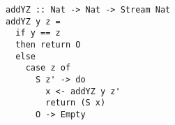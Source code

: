 \begin{figure}[!t]
  \centering
  \begin{minipage}{\columnwidth}
    \begin{lstlisting}[label={add_y_z}, caption={Function for \lstinline{addo out in in} direction}, captionpos=b, frame=tb]
addYZ :: Nat -> Nat -> Stream Nat
addYZ y z =
  if y == z
  then return O
  else
    case z of
      S z' -> do
        x <- addYZ y z'
        return (S x)
      O -> Empty
    \end{lstlisting}
  \end{minipage}
\end{figure}